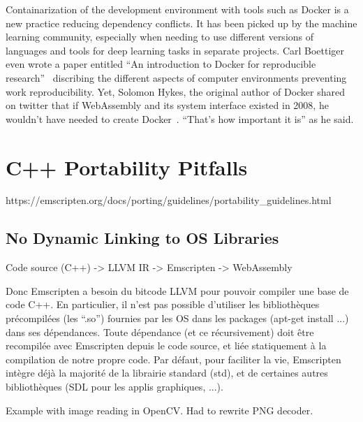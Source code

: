 Containarization of the development environment with tools such as Docker
is a new practice reducing dependency conflicts.
It has been picked up by the machine learning community,
especially when needing to use different versions of languages and tools
for deep learning tasks in separate projects.
Carl Boettiger even wrote a paper entitled
``An introduction to Docker for reproducible research''~\cite{boettiger2015introduction}
discribing the different aspects of computer environments preventing work reproducibility.
Yet, Solomon Hykes, the original author of Docker shared on twitter that
if WebAssembly and its system interface existed in 2008, he wouldn't have
needed to create Docker~\cite{hykes2019twitter}. ``That's how important it is'' as he said.

\section{C++ Portability Pitfalls}%
\label{sec:cpp_pitfalls}

https://emscripten.org/docs/porting/guidelines/portability\_guidelines.html

\subsection{No Dynamic Linking to OS Libraries}%
\label{sub:no_dynamic_linking}

Code source (C++) -> LLVM IR -> Emscripten -> WebAssembly

Donc Emscripten a besoin du bitcode LLVM pour pouvoir compiler une base de code C++. En particulier, il n’est pas possible d’utiliser les bibliothèques précompilées (les “.so”) fournies par les OS dans les packages (apt-get install ...) dans ses dépendances. Toute dépendance (et ce récursivement) doit être recompilée avec Emscripten depuis le code source, et liée statiquement à la compilation de notre propre code. Par défaut, pour faciliter la vie, Emscripten intègre déjà la majorité de la librairie standard (std), et de certaines autres bibliothèques (SDL pour les applis graphiques, ...).

Example with image reading in OpenCV.
Had to rewrite PNG decoder.



